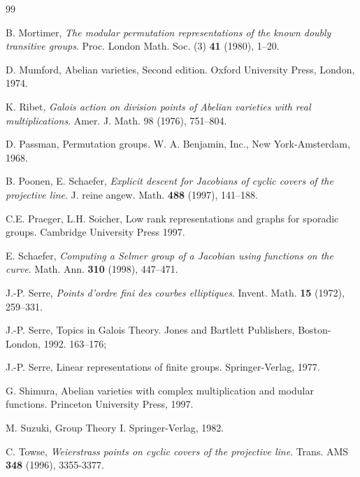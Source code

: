 \documentclass[12pt,a4paper,reqno]{amsart}
\theoremstyle{definition}
\begin{document}
\begin{thebibliography}{99}


 B. Mortimer, {\em The modular permutation representations of the known doubly transitive groups}.  Proc. London Math. Soc. (3) {\bf 41} (1980), 1--20.


 D. Mumford, Abelian varieties, Second edition. Oxford University Press, London, 1974.

 K. Ribet, {\em Galois action on division points of Abelian varieties with real
multiplications}. Amer. J. Math. 98 (1976), 751--804.

 D. Passman, Permutation groups. W. A. Benjamin, Inc., New York-Amsterdam, 1968.

 B. Poonen, E. Schaefer, {\em Explicit descent for Jacobians of cyclic covers of the projective line}. J. reine angew. Math. {\bf 488} (1997), 141--188.

 C.E. Praeger, L.H. Soicher, Low rank representations and graphs for sporadic groups.  Cambridge University Press 1997.

 E. Schaefer, {\em Computing a Selmer group of a Jacobian using functions on the curve}. Math. Ann. {\bf 310} (1998), 447--471.

 J.-P. Serre, {\em Points d'ordre fini des courbes elliptiques}. Invent. Math.  {\bf 15} (1972), 259--331.

 J.-P. Serre, Topics in Galois Theory. Jones and Bartlett Publishers, Boston-London, 1992. 163--176;

 J.-P. Serre, Linear representations of finite groups. Springer-Verlag, 1977.

 G. Shimura, Abelian varieties with complex multiplication and modular functions. Princeton University Press, 1997.



 M. Suzuki, Group Theory I. Springer-Verlag, 1982.

 C. Towse, {\em Weierstrass points on cyclic covers of the projective line}. Trans. AMS {\bf 348} (1996), 3355-3377.




\end{thebibliography}
\end{document}
